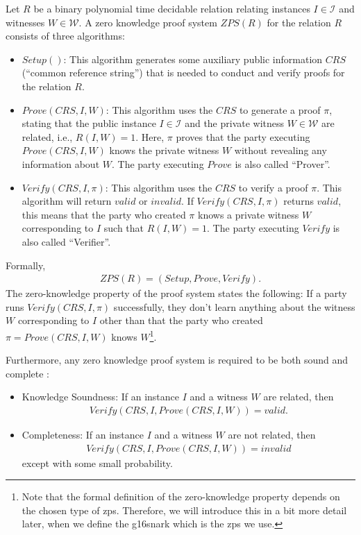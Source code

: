 \newpage
\begin{definition}
  \label{def:zpsForR}
  Let $R$ be a binary polynomial time decidable relation \cite{least_authority_moonmath_2024} relating instances $I\in\mathcal{I}$ and witnesses $W\in\mathcal{W}$.
  A zero knowledge proof system $ZPS(R)$ for the relation $R$ consists of three algorithms: 
  \begin{itemize}
    \item $Setup()$: This algorithm generates some auxiliary public information $CRS$ (``common reference string'') that is needed to conduct and verify proofs for the relation $R$.
    \item $Prove(CRS, I, W)$: This algorithm uses the $CRS$ to generate a proof $\pi$, stating that the public instance $I\in\mathcal{I}$ and the private witness $W\in\mathcal{W}$ are related, i.e., $R(I, W)=1$.
    Here, $\pi$ proves that the party executing $Prove(CRS, I, W)$ knows the private witness $W$ without revealing any information about $W$.
    The party executing $Prove$ is also called ``Prover''.
    \item $Verify(CRS, I, \pi)$: This algorithm uses the $CRS$ to verify a proof $\pi$. This algorithm will return $valid$ or $invalid$. 
    If $Verify(CRS, I, \pi)$ returns $valid$, this means that the party who created $\pi$ knows a private witness $W$ corresponding to $I$ such that $R(I, W)=1$.
    The party executing $Verify$ is also called ``Verifier''.
  \end{itemize}
  Formally, 
  \begin{align*}
    ZPS(R)=(Setup, Prove, Verify)\text{.}
  \end{align*}
  The zero-knowledge property of the proof system states the following: If a party runs $Verify(CRS, I, \pi)$ successfully, they don't learn anything about the witness $W$ corresponding to $I$ other than that the party who created $\pi=Prove(CRS, I, W)$ knows $W$\footnote{
    \label{footnote:differentZKDefs}
    Note that the formal definition of the zero-knowledge property depends on the chosen type of \gls{zps}.
    Therefore, we will introduce this in a bit more detail later, when we define the \gls{g16snark} \cite{groth_size_2016} which is the \gls{zps} we use.
  }.

  Furthermore, any zero knowledge proof system is required to be both sound and complete \cite{least_authority_moonmath_2024}:
  \begin{itemize}
    \item Knowledge Soundness: If an instance $I$ and a witness $W$ are related, then 
    \begin{align*}
      Verify(CRS, I, Prove(CRS, I, W))=valid\text{.}
    \end{align*}
    \item Completeness: If an instance $I$ and a witness $W$ are not related, then 
    \begin{align*}
      Verify(CRS, I, Prove(CRS, I, W))=invalid
    \end{align*} 
    except with some small probability.
  \end{itemize}
\end{definition}

